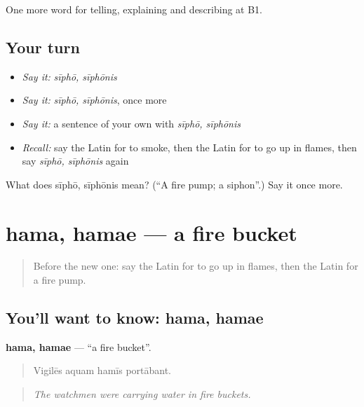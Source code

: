 \begin{grammarlens}[title={What you've built}]
One more word for telling, explaining and describing at B1.
\end{grammarlens}

\subsection*{Your turn}
\begin{itemize}
\raggedright
  \item \emph{Say it:} \emph{sīphō, sīphōnis}
  \item \emph{Say it:} \emph{sīphō, sīphōnis}, once more
  \item \emph{Say it:} a sentence of your own with \emph{sīphō, sīphōnis}
  \item \emph{Recall:} say the Latin for to smoke, then the Latin for to go up in flames, then say \emph{sīphō, sīphōnis} again
\end{itemize}

\begin{tcolorbox}[breakable,colback=teal!4,colframe=teal!35!black,title={Before you move on}]
What does sīphō, sīphōnis mean? (\textquotedblleft{}A fire pump; a siphon\textquotedblright{}.) Say it once more.
\end{tcolorbox}
\section[hama, hamae]{hama, hamae — a fire bucket}

\label{lesson:LA-C319-hama}



\begin{quote}
Before the new one: say the Latin for to go up in flames, then the Latin for a fire pump.
\end{quote}

\subsection*{You'll want to know: hama, hamae}
\textbf{hama, hamae} — \textquotedblleft{}a fire bucket\textquotedblright{}.

\begin{quote}
Vigilēs aquam hamīs portābant.
\end{quote}

\begin{quote}
\emph{The watchmen were carrying water in fire buckets.}
\end{quote}

